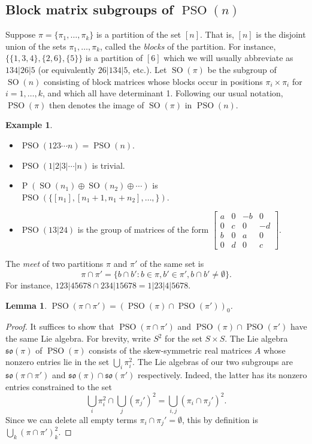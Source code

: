 \documentclass[reqno]{amsart}
\newtheorem{lemma}[theorem]{Lemma}
\theoremstyle{definition} \newtheorem{example}[theorem]{Example}
\newcommand{\SO}{\operatorname{SO}}
\newcommand{\PSO}{\operatorname{PSO}}
\newcommand{\so}{\mathfrak{so}}
\renewcommand{\P}{\operatorname{P}}
\begin{document}
\subsection{Block matrix subgroups of $\PSO(n)$} \label{subsec:block-subgroups}
Suppose $\pi = \{\pi_1, \ldots, \pi_k\}$ is a partition of the set $[n]$. That is, $[n]$ is the disjoint union of the sets $\pi_1, \ldots, \pi_k$, called the \emph{blocks} of the partition. For instance, $\{\{1,3,4\},\{2,6\},\{5\}\}$ is a partition of $[6]$ which we will usually abbreviate as $134|26|5$ (or equivalently $26|134|5$, etc.). Let $\SO(\pi)$ be the subgroup of $\SO(n)$ consisting of block matrices whose blocks occur in positions $\pi_i \times \pi_i$ for $i = 1, \ldots, k$, and which all have determinant 1. Following our usual notation, $\PSO(\pi)$ then denotes the image of $\SO(\pi)$ in $\PSO(n)$. 
\begin{example} \hfill
\begin{itemize}
\item $\PSO(123\cdots n) = \PSO(n)$.
\item $\PSO(1|2|3|\cdots|n)$ is trivial.
\item $\P(\SO(n_1) \oplus \SO(n_2) \oplus \cdots)$ is $\PSO(\{[n_1], [n_1+1,n_1+n_2], \ldots, \})$.
\item $\PSO(13|24)$ is the group of matrices of the form $\left[ \begin{smallmatrix}
a & 0 & -b & 0\\
0 & c & 0 & -d\\
b & 0 & a & 0\\
0 & d & 0 & c
\end{smallmatrix}\right]$.
\end{itemize}
\end{example}

The \emph{meet} of two partitions $\pi$ and $\pi'$ of the same set is
\begin{equation*}
\pi \cap \pi' = \{b \cap b' : b \in \pi, b' \in \pi', b \cap b' \neq \emptyset\}.
\end{equation*}
For instance, $123|45678 \cap 234|15678 = 1|23|4|5678$. 
\begin{lemma} \label{lem:intersection} $\PSO(\pi \cap \pi') = (\PSO(\pi) \cap \PSO(\pi'))_0$.
\end{lemma}
\begin{proof}
It suffices to show that $\PSO(\pi \cap \pi')$ and $\PSO(\pi) \cap \PSO(\pi')$ have the same Lie algebra. For brevity, write $S^2$ for the set $S \times S$. The Lie algebra $\so(\pi)$ of $\PSO(\pi)$ consists of the skew-symmetric real matrices $A$  whose nonzero entries lie in the set $\bigcup_i \pi_i^2$. The Lie algebras of our two subgroups are $\so(\pi \cap \pi')$ and $\so(\pi) \cap \so(\pi')$ respectively. Indeed, the latter has its nonzero entries constrained to the set
\begin{equation*}
\bigcup_i \pi_i^2 \cap \bigcup_j (\pi_j')^2 = \bigcup_{i,j} (\pi_i \cap \pi_j')^2.
\end{equation*}
Since we can delete all empty terms $\pi_i \cap \pi_j' = \emptyset$, this by definition is $\bigcup_{k} (\pi \cap \pi')_k^2$.
\end{proof}
\end{document}
